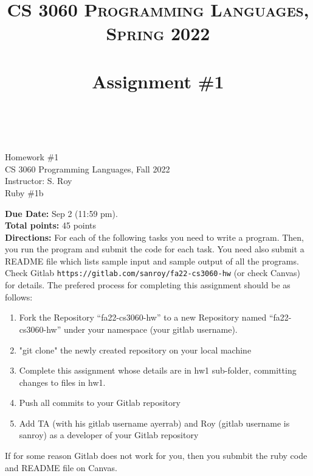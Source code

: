 \documentclass[paper=letter, fontsize=11pt]{scrartcl} %
\title{ 
    \normalfont \normalsize 
    \textsc{CS 3060 Programming Languages, Spring 2022} \\ [25pt] %
    \horrule{0.5pt} \\[0.4cm] %
    \huge Assignment \#1  \\ %
    \horrule{2pt} \\[0.5cm] %
}
\begin{document}
    \begin{center}
         Homework \#1\\
        \small CS 3060 Programming Languages, Fall 2022 \\
        \small Instructor: S. Roy \\
        \huge Ruby \#1b
    \end{center}
    
    \textbf{Due Date:}  Sep 2 (11:59 pm).\\

    \textbf{Total points:} 45 points \\

    \textbf{Directions:} For each of the following tasks you need to write a program. 
Then, you run the program and submit the code for each task. You need also submit a README file 
which lists sample input and sample output of all the programs. 
Check Gitlab \@ \texttt{https://gitlab.com/sanroy/fa22-cs3060-hw} (or check Canvas) for details. 
The prefered process for completing this assignment should be as follows:

    \begin{enumerate}[noitemsep]
        \item Fork the Repository ``fa22-cs3060-hw'' to a new Repository named ``fa22-cs3060-hw'' 
under your namespace (your gitlab username).
        \item "git clone" the newly created repository on your local machine
        \item Complete this assignment whose details are in hw1 sub-folder, committing changes to files in hw1. 
        \item Push all commits to your Gitlab repository
        \item Add TA (with his gitlab username ayerrab) and Roy (gitlab username is sanroy) as a developer of your Gitlab repository
    \end{enumerate}

If for some reason Gitlab does not work for you, then you submbit the ruby code and README file on Canvas.
\end{document}
